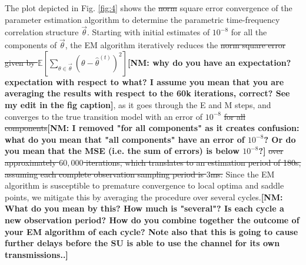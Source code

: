 \documentclass[10pt,twocolumn]{IEEEtran}
\newcommand{\sst}[1]{\st{#1}}
\newcommand{\nm}[1]{{\color{blue}\bf{[NM: #1]}}}
\newcommand{\add}[1]{{\color{red}{#1}}}
\begin{document}
The plot depicted in Fig. \ref{fig:4} shows the\sst{ norm} \add{mean} square\add{d} error
\add{(MSE)} convergence of the parameter estimation algorithm to determine the parametric time-frequency correlation structure $\vec{\theta}$\add{, averaged over $60,000$ iterations}.
\add{Assuming a timeslot duration of  $3$ms, this corresponds 
to an observation and estimation period of 180s.}
 Starting with initial estimates of $10^{-8}$ for all the components of $\vec{\theta}$, the EM algorithm iteratively reduces the \add{MSE}\sst{
norm square error given by $\mathbb{E}[\sum_{\theta{\in}\vec{\theta}}(\theta{-}\hat{\theta}^{(t)})^{2}]$}\nm{why do you have an expectation? expectation with respect to what? I assume you mean that you are averaging the results with respect to the 60k iterations, correct? See my edit in the fig caption}, as it goes through the E and M steps, and converges to the true transition model with an error of $10^{-8}$\sst{ for all components}\nm{I removed "for all components" as it creates confusion: what do you mean that "all components" have an error of $10^{-8}$? Or do you mean that the MSE (i.e. the sum of errors) is below $10^{-8}$?}
\sst{ over approximately $60,000$ iterations, which translates to an estimation period of 180s, assuming each complete observation sampling period is $3$ms.} Since the EM algorithm is susceptible to premature convergence to local optima and saddle points, we mitigate this by averaging the procedure over several cycles.\nm{What do you mean by this? How much is "several"?
Is each cycle a new observation period?
How do you combine together the outcome of your EM algorithm of each cycle?
 Note also that this is going to cause further delays before the SU is able to use the channel for its own transmissions..}
\end{document}
